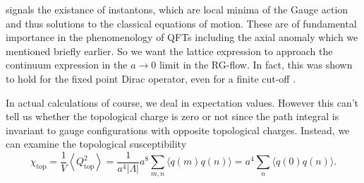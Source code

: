 \documentclass[a4paper,10pt]{article}
\begin{document}
signals the existance of instantons, which are local minima of the Gauge action and thus  solutions to the classical equations of motion. These are of fundamental importance in the phenomenology of QFTs including the axial anomaly which we mentioned briefly earlier. So we want the lattice expression to approach the continuum expression in the $a\rightarrow 0$ limit in the RG-flow. In fact, this was shown to hold for the fixed point Dirac operator, even for a finite cut-off \cite{Hasenfratz_1998}.\par In actual calculations of course, we deal in expectation values. However this can't tell us whether the topological charge is zero or not since the path integral is invariant to gauge configurations with opposite topological charges. Instead, we can examine the topological susceptibility
\begin{equation}\label{eq:topological_susc}
\chi_{\mathrm{top}}=\frac{1}{V}\left\langle Q_{\mathrm{top}}^{2}\right\rangle=\frac{1}{a^{4}|\Lambda|} a^{8} \sum_{m, n}\langle q(m) q(n)\rangle=a^{4} \sum_{n}\langle q(0) q(n)\rangle.
\end{equation}
\end{document}
